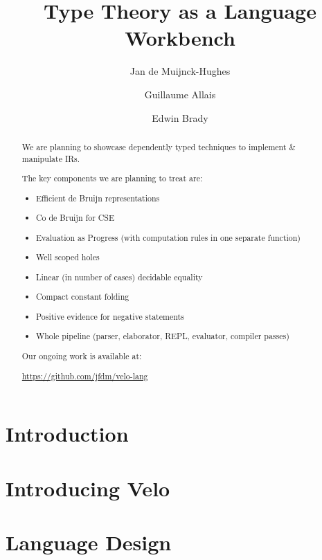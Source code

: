 \documentclass[%
draft, %
a4paper,
UKenglish,
cleveref,
autoref,
thm-restate,
pdfa
]{oasics-v2021}
\title{Type Theory as a Language Workbench} %
\author
{Jan {de Muijnck-Hughes}}
{University of Glasgow, UK}
{Jan.deMuijnck-Hughes@glasgow.ac.uk}
{https://orcid.org/0000-0003-2185-8543}
{} %
\author
{Guillaume Allais}
{University of St Andrews, UK}
{gxa1@st-andrews.ac.uk} %
{https://orcid.org/0000-0002-4091-657X} %
{} %
\author
{Edwin Brady}
{University of St Andrews, UK}
{ecb10@st-andrews.ac.uk} %
{} %
{} %
\begin{document}


\maketitle


\begin{abstract}
We are planning to showcase dependently typed techniques to implement \& manipulate IRs.

The key components we are planning to treat are:

\begin{itemize}
\item Efficient de Bruijn representations
\item Co de Bruijn for CSE
\item Evaluation as Progress (with computation rules in one separate function)
\item Well scoped holes
\item Linear (in number of cases) decidable equality
\item Compact constant folding
\item Positive evidence for negative statements
\item Whole pipeline (parser, elaborator, REPL, evaluator, compiler passes)
\end{itemize}

Our ongoing work is available at:

\url{https://github.com/jfdm/velo-lang}
\end{abstract}


\section{Introduction}
\label{sec:introduction}




\section{Introducing Velo}
\label{sec:velo}



\section{Language Design}
\label{sec:design}
\end{document}
